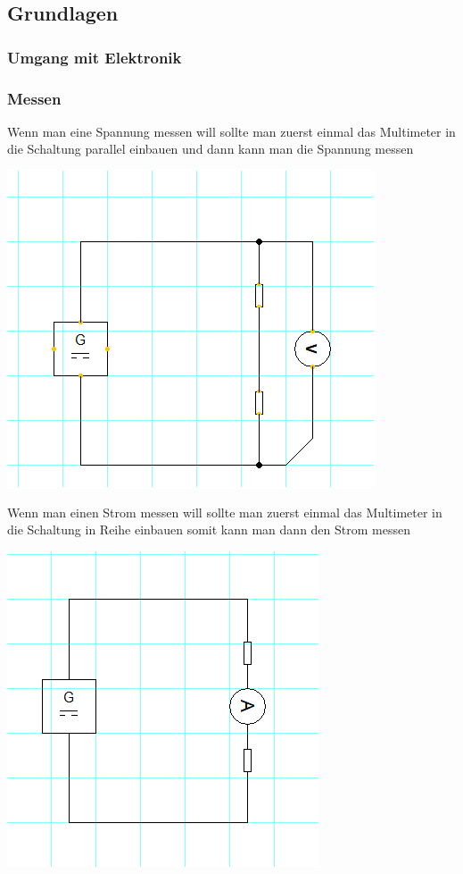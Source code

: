 \documentclass[notitlepage]{report}
\begin{document}
\subsection{Grundlagen}

\subsubsection{Umgang mit Elektronik}

\subsubsection{Messen}

Wenn man eine Spannung messen will sollte man zuerst einmal das Multimeter in die Schaltung parallel einbauen und dann kann man die Spannung messen

\includegraphics[scale=0.75]{3.png}

Wenn man einen Strom messen will sollte man zuerst einmal das Multimeter in die Schaltung in Reihe einbauen somit kann man dann den Strom messen

\includegraphics[scale=0.75]{2.png}
\end{document}
